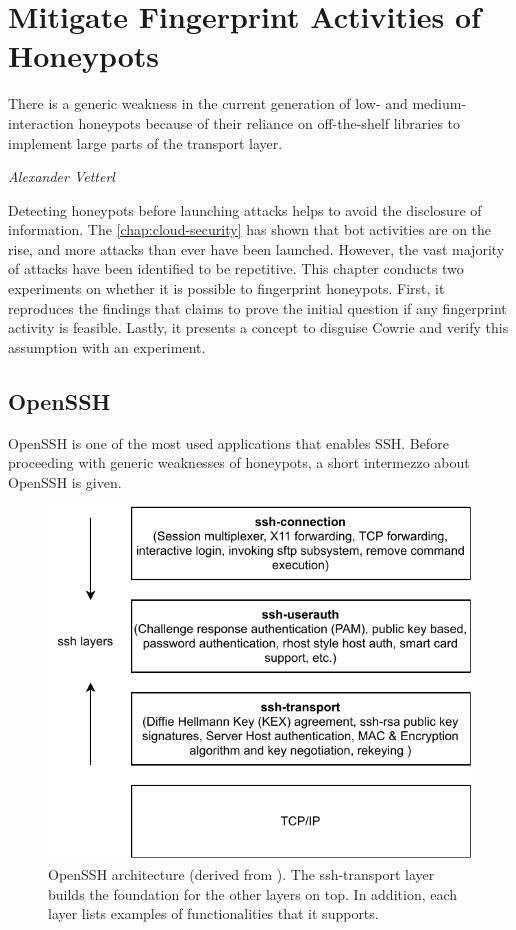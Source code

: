 \chapter{Mitigate Fingerprint Activities of Honeypots}
\label{chap:fingerprinting}

\epigraph{There is a generic weakness in the current generation of low- and medium-interaction honeypots because of their reliance on off-the-shelf libraries to implement large parts of the transport layer.}{\textit{Alexander Vetterl}}

Detecting honeypots before launching attacks helps to avoid the disclosure of information.
The \autoref{chap:cloud-security} has shown that bot activities are on the rise, and more attacks than ever have been launched.
However, the vast majority of attacks have been identified to be repetitive.
This chapter conducts two experiments on whether it is possible to fingerprint honeypots.
First, it reproduces the findings that \citet{vetterl2020} claims to prove the initial question if any fingerprint activity is feasible.
Lastly, it presents a concept to disguise Cowrie and verify this assumption with an experiment.

\section{OpenSSH}
\label{sec:openssh}

OpenSSH is one of the most used applications that enables SSH.
Before proceeding with generic weaknesses of honeypots, a short intermezzo about OpenSSH is given.

\begin{figure}
    \centering
    \includegraphics{figures/openssh-architecture.pdf}
    \caption[OpenSSH architecture]{
        OpenSSH architecture (derived from \cite{openssh2007}).
        The ssh-transport layer builds the foundation for the other layers on top.
        In addition, each layer lists examples of functionalities that it supports. 
    }
    \label{fig:openssh-architecture}
\end{figure}

